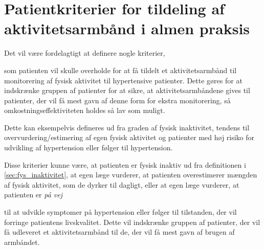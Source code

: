 \section{Patientkriterier for tildeling af aktivitetsarmbånd i almen praksis}

\noindent
Det vil være fordelagtigt at definere nogle kriterier, %

som patienten vil skulle overholde for at få tildelt et aktivitetsarmbånd til monitorering af fysisk aktivitet til hypertensive patienter. Dette gøres for at indskrænke gruppen af patienter for at sikre, at aktivitetsarmbåndene gives til patienter, der vil få mest gavn af denne form for ekstra monitorering, så omkostningseffektiviteten holdes så lav som muligt.

Dette kan eksempelvis defineres ud fra graden af fysisk inaktivitet, tendens til overvurdering/estimering af egen fysisk aktivitet og patienter med høj risiko for udvikling af hypertension eller følger til hypertension. 

Disse kriterier kunne være, at patienten er fysisk inaktiv ud fra definitionen i \autoref{sec:fys_inaktivitet}, at egen læge vurderer, at patienten overestimerer mængden af fysisk aktivitet, som de dyrker til dagligt, eller at egen læge vurderer, at patienten er \textit{på vej} %

 til at udvikle symptomer på hypertension eller følger til tilstanden, der vil forringe patientens livskvalitet. Dette vil indskrænke gruppen af patienter, der vil få udleveret et aktivitetsarmbånd til de, der vil få mest gavn af brugen af armbåndet. 


